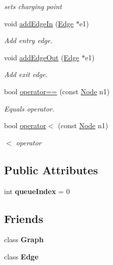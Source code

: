 \begin{DoxyCompactItemize}
\begin{DoxyCompactList}\small\item\em sets charging point \end{DoxyCompactList}\item 
void \mbox{\hyperlink{class_node_a2818059d54f94691d733f6d05c17015a}{add\+Edge\+In}} (\mbox{\hyperlink{class_edge}{Edge}} $\ast$e1)
\begin{DoxyCompactList}\small\item\em Add entry edge. \end{DoxyCompactList}\item 
void \mbox{\hyperlink{class_node_a815de14eaf18e8b62bf83717a86341bd}{add\+Edge\+Out}} (\mbox{\hyperlink{class_edge}{Edge}} $\ast$e1)
\begin{DoxyCompactList}\small\item\em Add exit edge. \end{DoxyCompactList}\item 
bool \mbox{\hyperlink{class_node_a1e6c8f645d5ef4855f4cc56eaeba33e2}{operator==}} (const \mbox{\hyperlink{class_node}{Node}} n1)
\begin{DoxyCompactList}\small\item\em Equals operator. \end{DoxyCompactList}\item 
bool \mbox{\hyperlink{class_node_ae72c904e058406e2c1c49e51e487ebd1}{operator$<$}} (const \mbox{\hyperlink{class_node}{Node}} n1)
\begin{DoxyCompactList}\small\item\em $<$ operator \end{DoxyCompactList}\end{DoxyCompactItemize}
\subsection*{Public Attributes}
\begin{DoxyCompactItemize}
\item 
\mbox{\label{class_node_a01788c18aef94f986ec563e8233365c1}} 
int {\bfseries queue\+Index} = 0
\end{DoxyCompactItemize}
\subsection*{Friends}
\begin{DoxyCompactItemize}
\item 
\mbox{\label{class_node_afab89afd724f1b07b1aaad6bdc61c47a}} 
class {\bfseries Graph}
\item 
\mbox{\label{class_node_ad2c8ba04c9d9989ccbf3c5aba267a3d7}} 
class {\bfseries Edge}
\end{DoxyCompactItemize}



